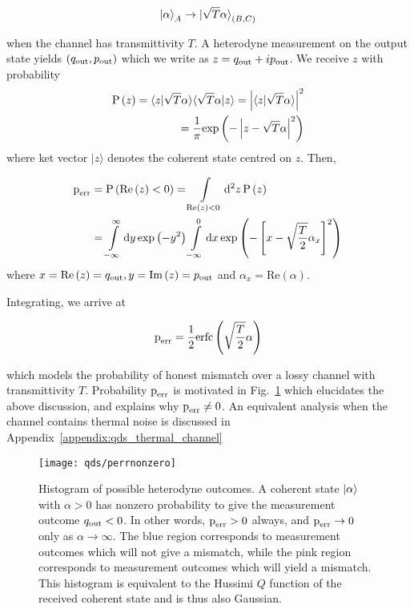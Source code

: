 \begin{equation}
\ket{\alpha}_A \rightarrow \ket{\sqrt{T}\alpha}_{\left(B, C\right)}
\end{equation}


\noindent when the channel has transmittivity $T$. A heterodyne measurement on the output state yields $\left(q_{\text{out}}, p_{\text{out}}\right)$ which we write as $z = q_{\text{out}} + i p_{\text{out}}$. We receive $z$ with probability
\begin{align}
\text{P}\left(z\right) = \langle z | \sqrt{T}\alpha\rangle\langle\sqrt{T}\alpha|z\rangle = \left|\langle z | \sqrt{T} \alpha \rangle \right|^2& \notag \\
= \frac{1}{\pi}\text{exp}\left( - \left| z - \sqrt{T}\alpha \right|^2 \right)&
\end{align}
where ket vector $|z\rangle$ denotes the coherent state centred on $z$. Then,

\begin{align}
\text{p}_{\text{err}} &= \text{P}\left(\text{Re}\left(z\right)<0\right) = \int\limits_{\text{Re}\left(z\right)<0}\mathop{}\!\mathrm{d^2} z \, \text{P}\left(z\right) \notag \\
&= \int\limits_{-\infty}^{\infty} \mathrm{d} y \, \text{exp}\left(-y^2\right) \int\limits_{-\infty}^{0} \mathrm{d} x \, \text{exp}\left(-\left[x - \sqrt{\frac{T}{2}}\alpha_x\right]^2\right)
\end{align}
where $x = \text{Re}\left(z\right)=q_{\text{out}}, y = \text{Im}\left(z\right)=p_{\text{out}}$ and $\alpha_x = \text{Re}\left(\alpha\right)$. 

Integrating, we arrive at

\begin{equation}\label{eqn:perr}
\text{p}_{\text{err}} = \frac{1}{2}\text{erfc}\left(\sqrt{\frac{T}{2}}\alpha\right)
\end{equation}

\noindent which models the probability of honest mismatch over a lossy channel with transmittivity $T$. Probability $\text{p}_{\text{err}}$ is motivated in Fig.~\ref{fig:perr} which elucidates the above discussion, and explains why $\text{p}_{\text{err}} \ne 0$. An equivalent analysis when the channel contains thermal noise is discussed in Appendix~\ref{appendix:qds_thermal_channel}

\begin{figure}[htp]
\captionsetup{width=0.8\linewidth}
\centering
\texttt{[image: qds/perrnonzero]}
\caption{\label{fig:perr} Histogram of possible heterodyne outcomes. A coherent state $\ket{\alpha}$ with $\alpha>0$ has nonzero probability to give the measurement outcome $q_{\text{out}} < 0$. In other words, $\text{p}_{\text{err}} > 0$ always, and $\text{p}_{\text{err}} \rightarrow 0$ only as $\alpha \rightarrow \infty$. The blue region corresponds to measurement outcomes which will not give a mismatch, while the pink region corresponds to measurement outcomes which will yield a mismatch. This histogram is equivalent to the Hussimi $Q$ function \cite{Leonhardt2010} of the received coherent state and is thus also Gaussian.}
\end{figure}


